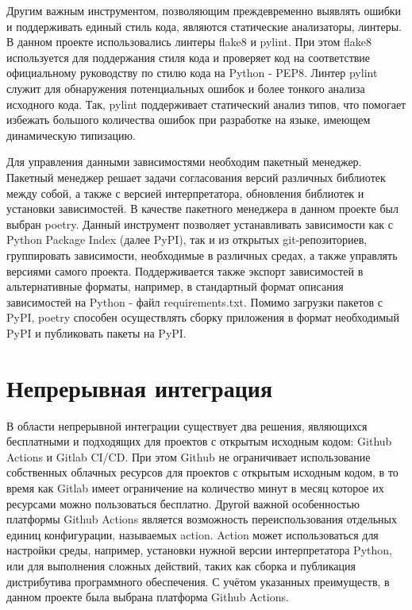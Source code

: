 Другим важным инструментом, позволяющим преждевременно выявлять ошибки и
поддерживать единый стиль кода, являются статические анализаторы, линтеры. В
данном проекте использовались линтеры flake8 и pylint. При этом flake8
используется для поддержания стиля кода и проверяет код на соответствие
официальному руководству по стилю кода на Python - PEP8. Линтер pylint служит
для обнаружения потенциальных ошибок и более тонкого анализа исходного кода.
Так, pylint поддерживает статический анализ типов, что помогает избежать
большого количества ошибок при разработке на языке, имеющем динамическую
типизацию.

Для управления данными зависимостями необходим пакетный менеджер. Пакетный
менеджер решает задачи согласования версий различных библиотек между собой, а
также с версией интерпретатора, обновления библиотек и установки зависимостей. В
качестве пакетного менеджера в данном проекте был выбран poetry. Данный
инструмент позволяет устанавливать зависимости как с Python Package Index (далее
PyPI), так и из открытых git-репозиториев, группировать зависимости, необходимые
в различных средах, а также управлять версиями самого проекта. Поддерживается
также экспорт зависимостей в альтернативные форматы, например, в стандартный
формат описания зависимостей на Python - файл requirements.txt. Помимо загрузки
пакетов с PyPI, poetry способен осуществлять сборку приложения в формат
необходимый PyPI и публиковать пакеты на PyPI.

\section{Непрерывная интеграция}

В области непрерывной интеграции существует два решения, являющихся бесплатными
и подходящих для проектов с открытым исходным кодом: Github Actions и Gitlab
CI/CD. При этом Github не ограничивает использование собственных облачных
ресурсов для проектов с открытым исходным кодом, в то время как Gitlab имеет
ограничение на количество минут в месяц которое их ресурсами можно пользоваться
бесплатно. Другой важной особенностью платформы Github Actions является
возможность переиспользования отдельных единиц конфигурации, называемых action.
Action может использоваться для настройки среды, например, установки нужной
версии интерпретатора Python, или для выполнения сложных действий, таких как
сборка и публикация дистрибутива программного обеспечения. С учётом указанных
преимуществ, в данном проекте была выбрана платформа Github Actions.

